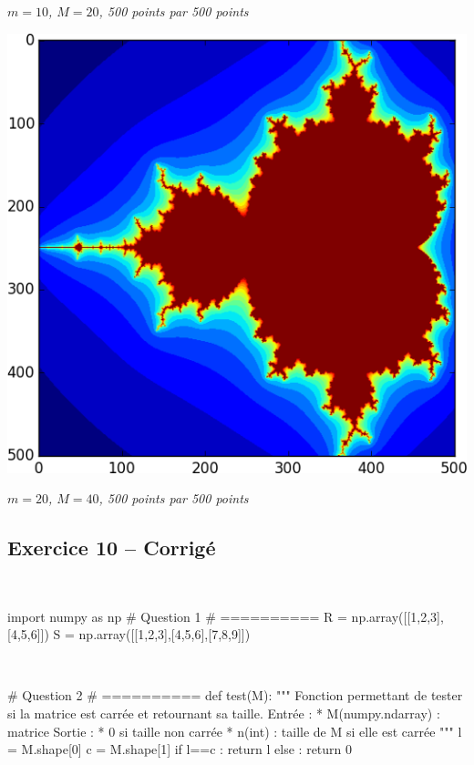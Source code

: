 \documentclass[10pt,fleqn]{article} %
\begin{document}
\begin{multicols}{2}
\begin{center}
\textit{$m=10$, $M=20$, 500 points par 500 points}
\end{center}

\begin{center}
\includegraphics[width=.8\linewidth]{programmes/Exercice_09/20_40_500}

\textit{$m=20$, $M=40$, 500 points par 500 points}
\end{center}

\subsection*{Exercice 10 -- Corrigé}
\begin{corrige}
$\quad$
\begin{python}
import numpy as np
# Question 1
# ==========
R = np.array([[1,2,3],[4,5,6]])
S = np.array([[1,2,3],[4,5,6],[7,8,9]])
\end{python}

\end{corrige}

\begin{corrige}
$\quad$
\begin{python}
# Question 2
# ==========
def test(M):
    """
    Fonction permettant de tester si la
    matrice est carrée et retournant sa taille.
    Entrée : 
     * M(numpy.ndarray) : matrice
    Sortie :
     * 0 si taille non carrée
     * n(int) : taille de M si elle est carrée
    """
    l = M.shape[0]
    c = M.shape[1]
    if l==c :
        return l
    else : 
        return 0


\end{python}
\end{corrige}
\end{multicols}
\end{document}
